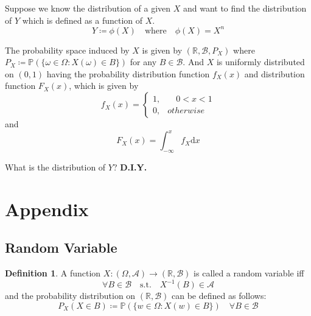 \documentclass[twoside]{article}
\makeatletter
\theoremstyle{definition}
\newtheorem{definition}{Definition}[section]
\theoremstyle{remark}
\theoremstyle{remark}
\newenvironment{example}
 {\patchcmd{\@thm}{\trivlist}{\list{}{\leftmargin=3em \rightmargin=3em}}{}{}%
  \vspace*{10\p@}
  \innerexample\pushQED{\hfill\ensuremath{\Diamond}}}
 {\popQED\endinnerexample}
\makeatother
\begin{document}
\begin{example}
  Suppose we know the distribution of a given $X$ and want to find the distribution
  of $Y$ which is defined as a function of $X$.
  \begin{equation*}
    Y \coloneqq \phi(X) \quad \textrm{where} \quad \phi(X) = X^n
  \end{equation*}

  The probability space induced by $X$ is given by $(\mathbb{R}, \mathcal{B}, P_X)$
  where $P_X \coloneqq \mathbb{P}({\{ \omega \in \Omega : X(\omega) \in B \}})$
  for any $B \in \mathcal{B}$. And $X$ is uniformly distributed on $(0, 1)$ having
  the probability distribution function $f_X(x)$ and distribution function $F_X(x)$,
  which is given by
  \begin{equation*}
    f_X(x) = \left\{
    \begin{array}{ll}
      1, & \quad 0 < x < 1 \\
      0, & otherwise
    \end{array}
    \right.
  \end{equation*}
  and
  \begin{equation*}
    F_X(x) = \int_{-\infty}^{x} f_X \mathrm{d}x
  \end{equation*}

  What is the distribution of $Y$? \textbf{D.I.Y.}
\end{example}


\section{Appendix}
\subsection{Random Variable}
\begin{definition}
  A function $X: (\Omega, \mathcal{A}) \rightarrow (\mathbb{R}, \mathcal{B})$ is
  called a random variable iff
  \begin{equation}
    \forall B \in \mathcal{B} \quad\textrm{s.t.}\quad X^{-1}(B) \in \mathcal{A}
  \end{equation}
  and the probability distribution on $(\mathbb{R}, \mathcal{B})$ can be defined as follows:
  \begin{equation}
    P_X(X \in B) \coloneqq \mathbb{P}(\{w \in \Omega : X(w) \in B\}) \quad \forall B \in \mathcal{B}
  \end{equation}
\end{definition}
\end{document}
